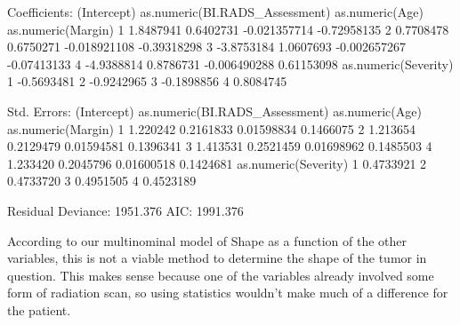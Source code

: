 \documentclass{article}
\begin{document}
\begin{Schunk}
\begin{Soutput}
Coefficients:
  (Intercept) as.numeric(BI.RADS_Assessment) as.numeric(Age) as.numeric(Margin)
1   1.8487941                      0.6402731    -0.021357714        -0.72958135
2   0.7708478                      0.6750271    -0.018921108        -0.39318298
3  -3.8753184                      1.0607693    -0.002657267        -0.07413133
4  -4.9388814                      0.8786731    -0.006490288         0.61153098
  as.numeric(Severity)
1           -0.5693481
2           -0.9242965
3           -0.1898856
4            0.8084745

Std. Errors:
  (Intercept) as.numeric(BI.RADS_Assessment) as.numeric(Age) as.numeric(Margin)
1    1.220242                      0.2161833      0.01598834          0.1466075
2    1.213654                      0.2129479      0.01594581          0.1396341
3    1.413531                      0.2521459      0.01698962          0.1485503
4    1.233420                      0.2045796      0.01600518          0.1424681
  as.numeric(Severity)
1            0.4733921
2            0.4733720
3            0.4951505
4            0.4523189

Residual Deviance: 1951.376 
AIC: 1991.376 
\end{Soutput}
\end{Schunk}
\hfill
According to our multinominal model of Shape as a function of the other variables, this is not a viable method to determine the shape of the tumor in question. This makes sense because one of the variables already involved some form of radiation scan, so using statistics wouldn't make much of a difference for the patient. 
\end{document}
